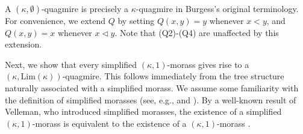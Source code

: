 \documentclass[]{amsart}
\theoremstyle{definition}
\theoremstyle{remark}
\begin{document}
A $(\kappa, \emptyset)$-quagmire is precisely a $\kappa$-quagmire in Burgess's original terminology. 
For convenience, we extend $Q$ by setting $Q(x,y)=y$ whenever $x<y$, and $Q(x,y)=x$ whenever $x\lhd y$. Note that (Q2)-(Q4) are unaffected by this extension.

Next, we show that every simplified $(\kappa,1)$-morass gives rise to a $(\kappa,\mathrm{Lim}(\kappa))$-quagmire. This follows immediately from the tree structure naturally associated with a simplified morass. We assume some familiarity with the definition of simplified morasses (see, e.g., \cite{MR736620}  and \cite[Ch. VIII, \S 4]{MR750828}). By a well-known result of Velleman, who introduced simplified morasses, the existence of a simplified $(\kappa, 1)$-morass is equivalent to the existence of a $(\kappa, 1)$-morass \cite{MR736620}.
\end{document}
